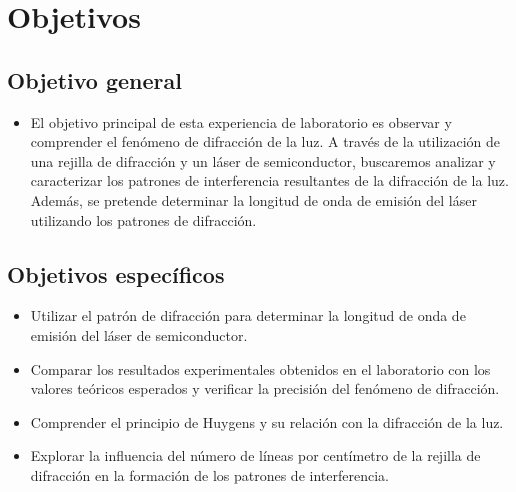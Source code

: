 \documentclass[twocolumn, 12pt]{article}
\begin{document}
\section{Objetivos}

\subsection{Objetivo general}

\begin{itemize}[label=$\triangleright$]
      \item El objetivo principal de esta experiencia de laboratorio es
            observar y comprender el fenómeno de difracción de la luz.
            A través de la utilización de una rejilla de difracción y
            un láser de semiconductor, buscaremos analizar y
            caracterizar los patrones de interferencia resultantes de
            la difracción de la luz. Además, se pretende determinar la
            longitud de onda de emisión del láser utilizando los
            patrones de difracción.
\end{itemize}

\subsection{Objetivos específicos}

\begin{itemize}[label=$\triangleright$]
      \item Utilizar el patrón de difracción para determinar la
            longitud de onda de emisión del láser de semiconductor.

      \item Comparar los resultados experimentales obtenidos en el
            laboratorio con los valores teóricos esperados y verificar
            la precisión del fenómeno de difracción.

      \item Comprender el principio de Huygens y su relación con la
            difracción de la luz.

      \item Explorar la influencia del número de líneas por centímetro
            de la rejilla de difracción en la formación de los patrones
            de interferencia.
\end{itemize}
\end{document}
